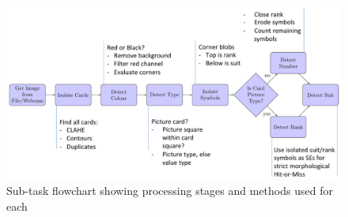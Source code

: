 \documentclass[a4paper,12pt,notitlepage]{article}
\begin{document}
		\begin{figure}[H]
			\centering
			\includegraphics[width=\textwidth]{chris/flowchart}
			\caption{Sub-task flowchart showing processing stages and methods used for each}
			\label{fig:flowchart}
		\end{figure}
\end{document}
